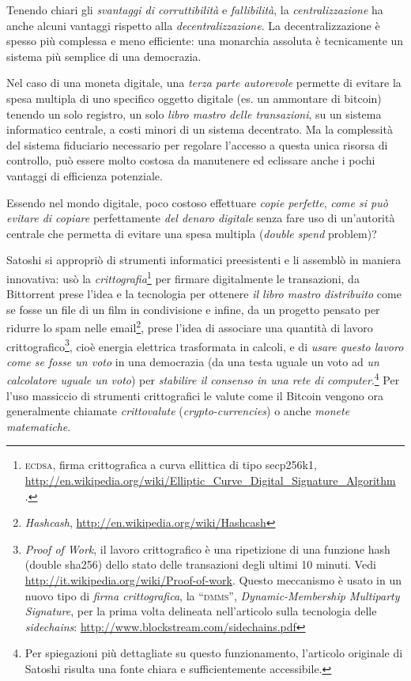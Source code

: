 \documentclass[a4paper,12pt,italian]{article}
\newcommand{\longurl}[1]{%
\href{#1}{\ttfamily \smaller #1}%
}%
\begin{document}
Tenendo chiari gli \emph{svantaggi di corruttibilità} e \emph{fallibilità}, la \emph{centralizzazione} 
ha anche alcuni vantaggi rispetto alla \emph{decentralizzazione}. La decentralizzazione è spesso più
complessa e meno efficiente: una monarchia assoluta è tecnicamente un sistema
più semplice di una democrazia. 

\smallskip


Nel caso di una moneta digitale, una \emph{terza parte autorevole} permette di evitare la spesa multipla
di uno specifico oggetto digitale (es. un ammontare di bitcoin) tenendo un solo registro, un solo \emph{libro mastro delle transazioni}, su 
un sistema informatico centrale, a costi minori di un sistema decentrato. Ma la complessità del sistema fiduciario necessario per 
regolare l'accesso a questa unica risorsa di controllo, può essere molto costosa da manutenere ed eclissare anche i pochi vantaggi di efficienza potenziale.

\smallskip
Essendo nel
mondo digitale, poco costoso effettuare \emph{copie perfette}, \emph{come si
può evitare di copiare} perfettamente \emph{del denaro digitale} senza fare uso di un'autorità centrale
che permetta di evitare una spesa multipla (\emph{double spend} problem)?


\smallskip

Satoshi si appropriò di strumenti informatici preesistenti e li assemblò
in maniera innovativa: usò la \emph{crittografia}\footnote{\textsc{ecdsa}, firma
crittografica a curva ellittica di tipo secp256k1, 
\longurl{http://en.wikipedia.org/wiki/Elliptic\_Curve\_Digital\_Signature\_Algorithm
}.} per firmare digitalmente le transazioni, da
Bittorrent prese
l’idea e la tecnologia per ottenere \emph{il libro mastro distribuito} come se
fosse un file di un film in condivisione e infine, da un progetto
pensato per ridurre lo spam nelle email\footnote{\emph{Hashcash},
\url{http://en.wikipedia.org/wiki/Hashcash}}, prese l’idea di associare una
quantità di lavoro crittografico\footnote{\emph{Proof of Work}, il lavoro
crittografico è una ripetizione di una funzione hash (double sha256)
dello stato delle transazioni degli ultimi 10 minuti. Vedi
\url{http://it.wikipedia.org/wiki/Proof-of-work}. Questo meccanismo è usato in un nuovo 
tipo di \emph{firma crittografica}, la ``\textsc{dmms}'', \emph{Dynamic-Membership Multiparty Signature}, per la
prima volta delineata nell'articolo sulla tecnologia delle \emph{sidechains}: \url{http://www.blockstream.com/sidechains.pdf}}, cioè energia
elettrica trasformata in calcoli, e di \emph{usare questo lavoro come se
fosse un voto} in una democrazia (da una testa uguale un voto ad \emph{un calcolatore
uguale un voto}) per \emph{stabilire il consenso in una rete di computer}.\footnote{Per
spiegazioni più dettagliate su questo funzionamento, l’articolo
originale di Satoshi risulta una fonte chiara e sufficientemente
accessibile.}
Per l'uso massiccio di strumenti crittografici le valute come il Bitcoin vengono ora generalmente chiamate
\emph{crittovalute} (\emph{crypto-currencies}) o anche \emph{monete matematiche}.
\end{document}
